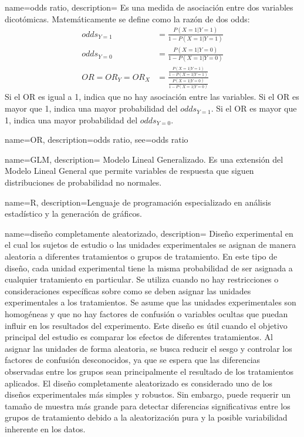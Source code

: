 {
    name=odds ratio,
    description={
        Es una medida de asociación entre dos variables dicotómicas.
        Matemáticamente se define como la razón de dos \gls{odds}:
        $$
        \begin{aligned}
        odds_{Y=1} &= \frac{P(X=1|Y=1)}{1-P(X=1|Y=1)}\\
        odds_{Y=0} &= \frac{P(X=1|Y=0)}{1-P(X=1|Y=0)}\\
        OR = OR_Y = OR_X &=\frac{\frac{P(X=1|Y=1)}{1-P(X=1|Y=1)}}{\frac{P(X=1|Y=0)}{1-P(X=1|Y=0)}}
        \end{aligned}
        $$
        Si el OR es igual a 1, indica que no hay asociación entre las variables.
        Si el OR es mayor que 1, indica una mayor probabilidad del $odds_{Y=1}$.
        Si el OR es mayor que 1, indica una mayor probabilidad del $odds_{Y=0}$.
    }
}


{
    name=OR,
    description={odds ratio},
    see={odds ratio}
}


{
    name=GLM,
    description={
        Modelo Lineal Generalizado.
        Es una extensión del Modelo Lineal General que permite variables de respuesta que siguen distribuciones
        de probabilidad no normales.
    }
}


{
    name=R,
    description={Lenguaje de programación especializado en análisis estadístico y la generación de gráficos.}
}



{
    name=diseño completamente aleatorizado,
    description={
        Diseño experimental en el cual los sujetos de estudio o las unidades experimentales se asignan de manera aleatoria
        a diferentes tratamientos o grupos de tratamiento.
        En este tipo de diseño, cada unidad experimental tiene la misma probabilidad de ser asignada a cualquier
        tratamiento en particular. Se utiliza cuando no hay restricciones o consideraciones específicas sobre como
        se deben asignar las unidades experimentales a los tratamientos.
        Se asume que las unidades experimentales son homogéneas y que no hay factores de confusión o
        variables ocultas que puedan influir en los resultados del experimento.
        Este diseño es útil cuando el objetivo principal del estudio es comparar los efectos de diferentes
        tratamientos. Al asignar las unidades de forma aleatoria, se busca reducir el sesgo y controlar
        los factores de confusión desconocidos, ya que se espera que las diferencias observadas entre los grupos
        sean principalmente el resultado de los tratamientos aplicados. El diseño completamente aleatorizado
        es considerado uno de los diseños experimentales más simples y robustos.
        Sin embargo, puede requerir un tamaño de muestra más grande para detectar diferencias significativas
        entre los grupos de tratamiento debido a la aleatorización pura y la posible variabilidad
        inherente en los datos.
        }
}


